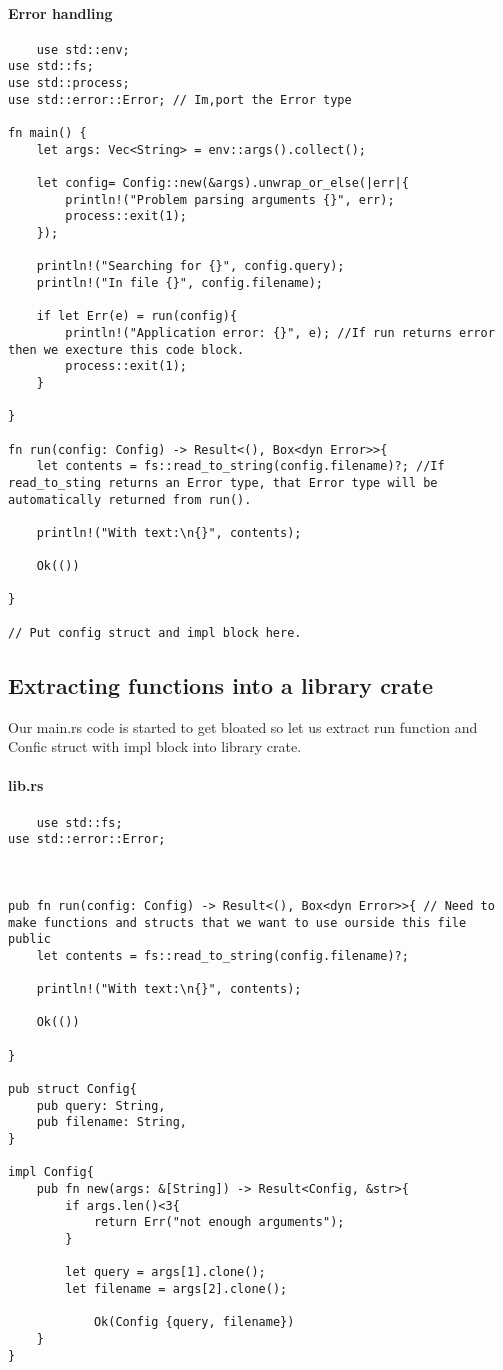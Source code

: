\paragraph*{Error handling}\begin{lstlisting}
    use std::env;
use std::fs;
use std::process;
use std::error::Error; // Im,port the Error type

fn main() {
    let args: Vec<String> = env::args().collect(); 
    
    let config= Config::new(&args).unwrap_or_else(|err|{
        println!("Problem parsing arguments {}", err);
        process::exit(1);
    });

    println!("Searching for {}", config.query);
    println!("In file {}", config.filename);

    if let Err(e) = run(config){
        println!("Application error: {}", e); //If run returns error then we execture this code block.
        process::exit(1);
    }

}

fn run(config: Config) -> Result<(), Box<dyn Error>>{
    let contents = fs::read_to_string(config.filename)?; //If read_to_sting returns an Error type, that Error type will be automatically returned from run(). 

    println!("With text:\n{}", contents);

    Ok(())

}

// Put config struct and impl block here.
\end{lstlisting}

\subsection{Extracting functions into a library crate}
Our main.rs code is started to get bloated so let us extract run function and Confic struct with impl block into library crate.

\paragraph*{lib.rs}\begin{lstlisting}
    use std::fs;
use std::error::Error;



pub fn run(config: Config) -> Result<(), Box<dyn Error>>{ // Need to make functions and structs that we want to use ourside this file public 
    let contents = fs::read_to_string(config.filename)?;  

    println!("With text:\n{}", contents);

    Ok(())

}

pub struct Config{
    pub query: String,
    pub filename: String,
}

impl Config{
    pub fn new(args: &[String]) -> Result<Config, &str>{
        if args.len()<3{
            return Err("not enough arguments");
        }

        let query = args[1].clone();
        let filename = args[2].clone();
        
            Ok(Config {query, filename})
    } 
}
\end{lstlisting}

